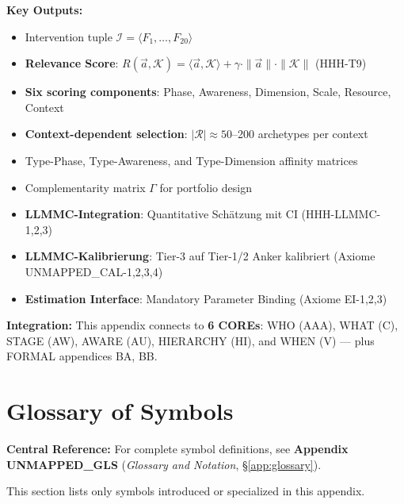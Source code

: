 \begin{tcolorbox}[colback=green!10!white, colframe=green!75!black,
    title=\textbf{Appendix TKT: Summary}]
\textbf{Key Outputs:}
\begin{itemize}[nosep]
    \item Intervention tuple $\mathcal{I} = \langle F_1, \ldots, F_{20} \rangle$
    \item \textbf{Relevance Score}: $R(\vec{a}, \mathcal{K}) = \langle \vec{a}, \mathcal{K} \rangle + \gamma \cdot \|\vec{a}\| \cdot \|\mathcal{K}\|$ (HHH-T9)
    \item \textbf{Six scoring components}: Phase, Awareness, Dimension, Scale, Resource, Context
    \item \textbf{Context-dependent selection}: $|\mathcal{R}| \approx 50$--200 archetypes per context
    \item Type-Phase, Type-Awareness, and Type-Dimension affinity matrices
    \item Complementarity matrix $\Gamma$ for portfolio design
    \item \textbf{LLMMC-Integration}: Quantitative Schätzung mit CI (HHH-LLMMC-1,2,3)
    \item \textbf{LLMMC-Kalibrierung}: Tier-3 auf Tier-1/2 Anker kalibriert (Axiome UNMAPPED_CAL-1,2,3,4)
    \item \textbf{Estimation Interface}: Mandatory Parameter Binding (Axiome EI-1,2,3)
\end{itemize}

\textbf{Integration:} This appendix connects to \textbf{6 COREs}: WHO (AAA), WHAT (C), STAGE (AW), AWARE (AU), HIERARCHY (HI), and WHEN (V) --- plus FORMAL appendices BA, BB.

\end{tcolorbox}


\section{Glossary of Symbols}
\label{sec:hhh-glossary}

\begin{tcolorbox}[colback=blue!5!white, colframe=blue!75!black]
\textbf{Central Reference:} For complete symbol definitions, see
\textbf{Appendix UNMAPPED_GLS} (\textit{Glossary and Notation}, \S\ref{app:glossary}).

This section lists only symbols introduced or specialized in this appendix.
\end{tcolorbox}

\vspace{0.5em}

